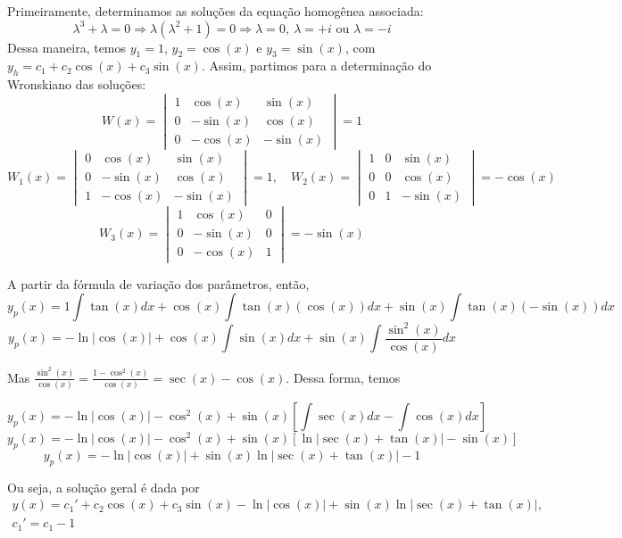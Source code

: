 \documentclass[oneside,12pt,a4paper]{report}
\begin{document}
\begin{resolucao}
    
    \itemresolucao Primeiramente, determinamos as soluções da equação homogênea associada:
    \[\lambda^3+\lambda=0\Rightarrow\lambda(\lambda^2+1)=0\Rightarrow\lambda=0,~\lambda=+i\text{ ou }\lambda=-i\]
    Dessa maneira, temos $y_1=1$, $y_2=\cos(x)$ e $y_3=\sin(x)$, com $y_h=c_1+c_2\cos(x)+c_3\sin(x)$. Assim, partimos para a determinação do Wronskiano das soluções:
    \[W(x)=\begin{vmatrix}
        1 & \cos(x) & \sin(x)\\
        0 & -\sin(x) & \cos(x)\\
        0 & -\cos(x) & -\sin(x)
    \end{vmatrix}=1\]
    \[W_1(x)=\begin{vmatrix}
        0 & \cos(x) & \sin(x)\\
        0 & -\sin(x) & \cos(x)\\
        1 & -\cos(x) & -\sin(x)
    \end{vmatrix}=1, 
    \quad W_2(x)=\begin{vmatrix}
        1 & 0 & \sin(x)\\
        0 & 0 & \cos(x)\\
        0 & 1 & -\sin(x)
    \end{vmatrix}=-\cos(x)\]
    \[W_3(x)=\begin{vmatrix}
        1 & \cos(x) &  0\\
        0 & -\sin(x) & 0\\
        0 & -\cos(x) & 1
    \end{vmatrix}=-\sin(x)\]

    A partir da fórmula de variação dos parâmetros, então,
    \[y_p(x)=1\int\tan(x)dx+\cos(x)\int\tan(x)(\cos(x))dx+\sin(x)\int\tan(x)(-\sin(x))dx\]
    \[y_p(x)=-\ln|\cos(x)|+\cos(x)\int\sin(x)dx+\sin(x)\int\frac{\sin^2(x)}{\cos(x)}dx\]

    Mas $\displaystyle\frac{\sin^2(x)}{\cos(x)}=\frac{1-\cos^2(x)}{\cos(x)}=\sec(x)-\cos(x)$. Dessa forma, temos

    \[y_p(x)=-\ln|\cos(x)|-\cos^2(x)+\sin(x)\left[\int\sec(x)dx-\int\cos(x)dx\right]\]
    \[y_p(x)=-\ln|\cos(x)|-\cos^2(x)+\sin(x)\left[\ln|\sec(x)+\tan(x)|-\sin(x)\right]\]
    \[y_p(x)=-\ln|\cos(x)|+\sin(x)\ln|\sec(x)+\tan(x)|-1\]

    Ou seja, a solução geral é dada por
    \begin{gather*}
        \boxed{y(x)=c_1'+c_2\cos(x)+c_3\sin(x)-\ln|\cos(x)|+\sin(x)\ln|\sec(x)+\tan(x)|},\\
        c_1'=c_1-1
    \end{gather*}


\end{resolucao}
\end{document}
